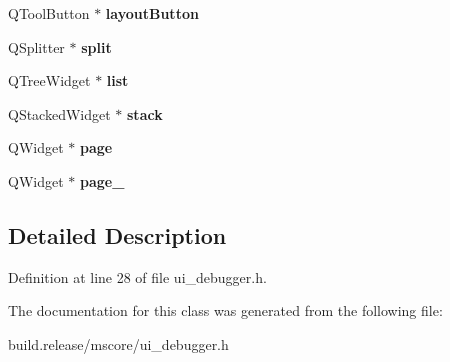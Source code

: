 \begin{DoxyCompactItemize}
Q\+Tool\+Button $\ast$ {\bfseries layout\+Button}
\item 
\mbox{\label{class_ui___debugger_base_a0e360c9a9503f40b646fd0b6d0668157}} 
Q\+Splitter $\ast$ {\bfseries split}
\item 
\mbox{\label{class_ui___debugger_base_ac507723c727a437607a76ae7c3a36887}} 
Q\+Tree\+Widget $\ast$ {\bfseries list}
\item 
\mbox{\label{class_ui___debugger_base_a9d42db05f2aceb6da45adf796a609ac5}} 
Q\+Stacked\+Widget $\ast$ {\bfseries stack}
\item 
\mbox{\label{class_ui___debugger_base_a60f3c4d0a8d2760523fc53106b1ad046}} 
Q\+Widget $\ast$ {\bfseries page}
\item 
\mbox{\label{class_ui___debugger_base_a53eed4514b75087834e04f3da9cde0d1}} 
Q\+Widget $\ast$ {\bfseries page\+\_}
\end{DoxyCompactItemize}


\subsection{Detailed Description}


Definition at line 28 of file ui\+\_\+debugger.\+h.



The documentation for this class was generated from the following file\+:\begin{DoxyCompactItemize}
\item 
build.\+release/mscore/ui\+\_\+debugger.\+h\end{DoxyCompactItemize}
